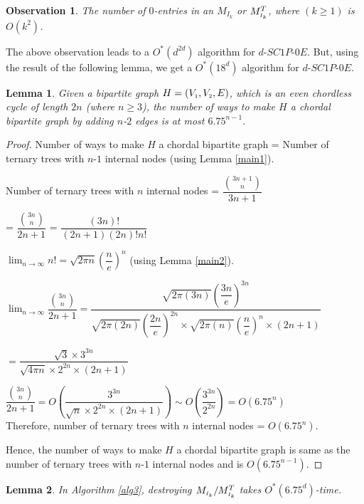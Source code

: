\documentclass[review, 1p]{elsarticle}
\newtheorem{lemma}{Lemma}
\newtheorem{Observation}{Observation}
\begin{document}
\begin{Observation}
The number of $0$-entries in an $M_{I_{k}}$ or $M^{T}_{\mathsmaller I_{k}}$, where $(k \geq 1)$ is $O(k^{2})$.
\end{Observation}
The above observation leads to a $O^{*}(d^{2d})$ algorithm for $d$-$SC1P$-$0E$. But, using the result of the following lemma, we get a $O^{*}(18^{d})$ algorithm for $d$-$SC1P$-$0E$.
\begin{lemma}\label{obs2}
Given a bipartite graph $H=(V_{\mathsmaller{1}}, V_{\mathsmaller{2}}, E)$, which is an even chordless cycle of length $2n$ (where $n \geq 3$), the number of ways to make $H$ a chordal bipartite graph by adding $n$-$2$ edges is at most $6.75^{n-1}$.
\end{lemma}
\begin{proof}
Number of ways to make $H$ a chordal bipartite graph = Number of ternary trees with $n$-$1$ internal nodes (using Lemma \ref{main1}).

Number of ternary trees with $n$ internal nodes = $ \dfrac{{\binom {3n+1} {n}}}{3n+1}$
 
\hspace{1.5 in}= $\dfrac{{\binom {3n} {n}}}{2n+1}$ = $\dfrac{(3n)!}{(2n+1)(2n)!n!}$  


$\lim_{n\to\infty} n! = {\sqrt{2\pi{n}}{(\dfrac{n}{e})}^{n}}$ (using Lemma \ref{main2}).

$\lim_{n\to\infty} \dfrac{{\binom {3n} {n}}}{2n+1} = \dfrac{{\sqrt{2\pi (3n)}{(\dfrac{3n}{e})}^{3n}}} {{\sqrt{2\pi (2n)}{(\dfrac{2n}{e})}^{2n}}\times {\sqrt{2\pi (n)}{(\dfrac{n}{e})}^{n}} \times (2n+1)}$

\hspace{1.5 in} $ = \dfrac{ {\sqrt{3}}\times3^{3n} }{ {\sqrt{4\pi{n}}}\times2^{2n}\times(2n+1) } $

$ \dfrac{{\binom {3n} {n}}}{2n+1} = O({\dfrac{3^{3n}}{\sqrt{n}\times2^{2n}\times(2n+1)}}) \sim O({\dfrac{3^{3n}}{2^{2n}}}) = O(6.75^n) $\\

Therefore, number of ternary trees with $n$ internal nodes = $O(6.75^n)$.
 
Hence, the number of ways to make $H$ a chordal bipartite graph is same as the number of ternary trees with $n$-$1$ internal nodes and is $O(6.75^{n-1})$. 
\end{proof}
\begin{lemma}\label{lem2}
In Algorithm \ref{alg3}, destroying $M_{\mathsmaller I_{k}}/M_{\mathsmaller I_{k}}^{T}$ takes $O^{*}(6.75^{d})$-time.
\end{lemma}
\end{document}
